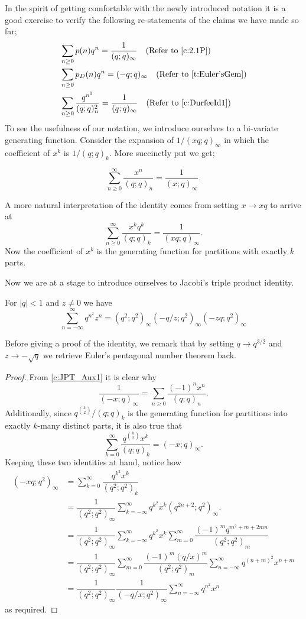 \raggedbottom
In the spirit of getting comfortable with the newly introduced notation it is a good exercise to verify the following re-statements of the claims we have made so far;
\begin{align*}
    &\sum_{n \geq 0} p(n) q^n = \dfrac{1}{(q;q)_\infty} \quad (\text{Refer to } \cref{c:2.1P}) \\
    &\sum_{n \geq 0} p_D(n) q^n = (-q;q)_\infty \quad (\text{Refer to } \cref{t:Euler'sGem}) \\
    &\sum_{n \geq 0} \dfrac{q^{n^2}}{(q;q)_n^2} =\dfrac{1}{(q;q)_\infty}\quad (\text{Refer to } \cref{c:DurfeeId1})
\end{align*}
To see the usefulness of our notation, we introduce ourselves to a bi-variate generating function. Consider the expansion of $1/(xq;q)_\infty$ in which the coefficient of $x^k$ is $1/(q;q)_k$. More succinctly put we get;
\begin{claim}
\[\sum_{n\geq 0}^\infty\dfrac{x^n}{(q;q)_n} = \dfrac{1}{(x;q)_\infty}.\]
\label{c:JPT_Aux1}
\end{claim}
A more natural interpretation of the identity comes from setting $x\to xq$ to arrive at
\[
\sum_{n\geq 0}^\infty \dfrac{x^kq^k}{(q;q)_k} = \dfrac{1}{(xq;q)_\infty}.
\]
Now the coefficient of $x^k$ is the generating function for partitions with exactly $k$ parts. 
\par
Now we are at a stage to introduce ourselves to Jacobi's triple product identity.
\begin{theorem}
For $|q|<1$ and $z\neq 0$ we have 
\[
\sum_{n=-\infty}^{\infty}q^{n^2}z^n = (q^2;q^2)_\infty (-q/z;q^2)_\infty (-zq;q^2)_\infty
\]
\end{theorem}
Before giving a proof of the identity, we remark that by setting $q\to q^{3/2}$ and $z\to -\sqrt{q}$ we retrieve Euler's pentagonal number theorem back. 
\begin{proof}
From \cref{c:JPT_Aux1} it is clear why \[
\dfrac{1}{(-x;q)_\infty} = \sum_{n\geq 0}\dfrac{(-1)^nx^n}{(q;q)_n}. 
\] Additionally, since $q^{\binom{k}{2}}/(q;q)_k$ is the generating function for partitions into exactly $k$-many distinct parts, it is also true that \[
\sum_{k=0}^{\infty}\dfrac{q^{\binom{k}{2}}x^k}{(q;q)_k} = (-x;q)_\infty.
\]
Keeping these two identities at hand, notice how
\begin{align*}
    (-xq;q^2)_\infty &= \sum_{k=0}^\infty \dfrac{q^{k^2}x^k}{(q^2;q^2)_k} \\
    &= \dfrac{1}{(q^2;q^2)_\infty}\sum_{k=-\infty}^{\infty}q^{k^2}x^k(q^{2n+2};q^2)_\infty. \\
    &= \dfrac{1}{(q^2;q^2)_\infty}\sum_{k=-\infty}^{\infty}q^{k^2}x^k\sum_{m=0}^{\infty}\dfrac{(-1)^mq^{m^2+m+2mn}}{(q^2;q^2)_m} \\
    &=\dfrac{1}{(q^2;q^2)_\infty}\sum_{m=0}^{\infty}\dfrac{(-1)^m(q/x)^m}{(q^2;q^2)_m}\sum_{n=-\infty}^{\infty}q^{(n+m)^2}x^{n+m} \\
    &= \dfrac{1}{(q^2;q^2)_\infty}\dfrac{1}{(-q/x;q^2)_\infty}\sum_{n=-\infty}^{\infty}q^{n^2}x^n
\end{align*}
as required. 
\end{proof}
